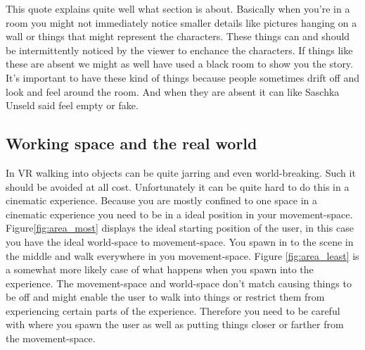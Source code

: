 \documentclass{report}
\begin{document}
				This quote explains quite well what section is about. Basically when you're in a room you might not immediately notice smaller details like pictures hanging on a wall or things that might represent the characters. These things can and should be intermittently noticed by the viewer to enchance the characters. If things like these are absent we might as well have used a black room to show you the story. 				
				It's important to have these kind of things because people sometimes drift off and look and feel around the room. And when they are absent it can like Saschka Unseld said feel empty or fake.
				
				\subsection{Working space and the real world}
				In VR walking into objects can be quite jarring and even world-breaking. Such it should be avoided at all cost. Unfortunately it can be quite hard to do this in a cinematic experience. Because you are mostly confined to one space in a cinematic experience you need to be in a ideal position in your movement-space. 
				Figure\ref{fig:area_most} displays the ideal starting position of the user, in this case you have the ideal world-space to movement-space. You spawn in to the scene in the middle and walk everywhere in you movement-space. Figure \ref{fig:area_least} is a somewhat more likely case of what happens when you spawn into the experience. The movement-space and world-space don't match causing things to be off and might enable the user to walk into things or restrict them from experiencing certain parts of the experience. Therefore you need to be careful with where you spawn the user as well as putting things closer or farther from the movement-space. 
				
\end{document}
